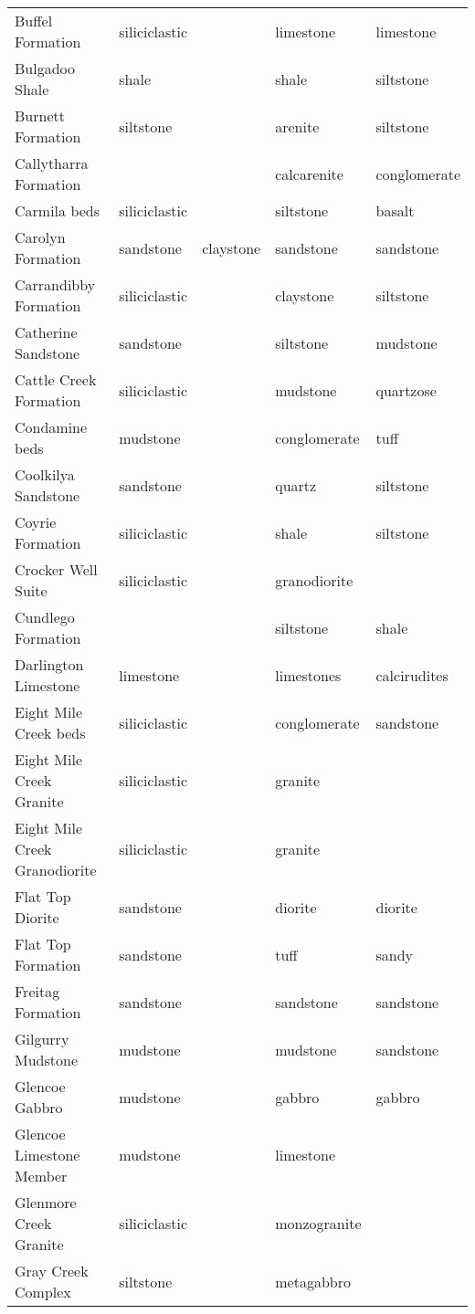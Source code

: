 \begin{table}[ht]
\begin{tabular}{lllll}
  Buffel Formation & siliciclastic &  & limestone & limestone \\ 
  Bulgadoo Shale & shale &  & shale & siltstone \\ 
  Burnett Formation & siltstone &  & arenite & siltstone \\ 
  Callytharra Formation &  &  & calcarenite & conglomerate \\ 
  Carmila beds & siliciclastic &  & siltstone & basalt \\ 
  Carolyn Formation & sandstone & claystone & sandstone & sandstone \\ 
  Carrandibby Formation & siliciclastic &  & claystone & siltstone \\ 
  Catherine Sandstone & sandstone &  & siltstone & mudstone \\ 
  Cattle Creek Formation & siliciclastic &  & mudstone & quartzose \\ 
  Condamine beds & mudstone &  & conglomerate & tuff \\ 
  Coolkilya Sandstone & sandstone &  & quartz & siltstone \\ 
  Coyrie Formation & siliciclastic &  & shale & siltstone \\ 
  Crocker Well Suite & siliciclastic &  & granodiorite &  \\ 
  Cundlego Formation &  &  & siltstone & shale \\ 
  Darlington Limestone & limestone &  & limestones & calcirudites \\ 
  Eight Mile Creek beds & siliciclastic &  & conglomerate & sandstone \\ 
  Eight Mile Creek Granite & siliciclastic &  & granite &  \\ 
  Eight Mile Creek Granodiorite & siliciclastic &  & granite &  \\ 
  Flat Top Diorite & sandstone &  & diorite & diorite \\ 
  Flat Top Formation & sandstone &  & tuff & sandy \\ 
  Freitag Formation & sandstone &  & sandstone & sandstone \\ 
  Gilgurry Mudstone & mudstone &  & mudstone & sandstone \\ 
  Glencoe Gabbro & mudstone &  & gabbro & gabbro \\ 
  Glencoe Limestone Member & mudstone &  & limestone &  \\ 
  Glenmore Creek Granite & siliciclastic &  & monzogranite &  \\ 
  Gray Creek Complex & siltstone &  & metagabbro &  \\ 

\end{tabular}
\end{table}
